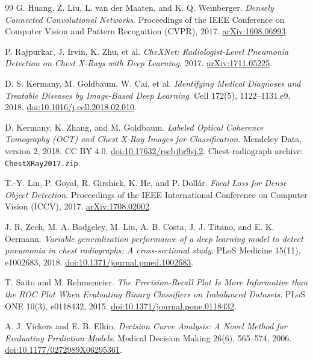 \documentclass[12pt,letterpaper]{article}
\begin{document}
\clearpage
\begin{thebibliography}{99}
G. Huang, Z. Liu, L. van der Maaten, and K. Q. Weinberger.
\textit{Densely Connected Convolutional Networks}.
Proceedings of the IEEE Conference on Computer Vision and Pattern Recognition (CVPR), 2017.
\href{https://arxiv.org/abs/1608.06993}{arXiv:1608.06993}.

P. Rajpurkar, J. Irvin, K. Zhu, et al.
\textit{CheXNet: Radiologist-Level Pneumonia Detection on Chest X-Rays with Deep Learning}.
2017.
\href{https://arxiv.org/abs/1711.05225}{arXiv:1711.05225}.

D. S. Kermany, M. Goldbaum, W. Cai, et al.
\textit{Identifying Medical Diagnoses and Treatable Diseases by Image-Based Deep Learning}.
Cell 172(5), 1122--1131.e9, 2018.
\href{https://doi.org/10.1016/j.cell.2018.02.010}{doi:10.1016/j.cell.2018.02.010}.

D. Kermany, K. Zhang, and M. Goldbaum.
\textit{Labeled Optical Coherence Tomography (OCT) and Chest X-Ray Images for Classification}.
Mendeley Data, version 2, 2018. CC BY 4.0.
\href{https://doi.org/10.17632/rscbjbr9sj.2}{doi:10.17632/rscbjbr9sj.2}.
Chest-radiograph archive: \texttt{ChestXRay2017.zip}.

T.-Y. Lin, P. Goyal, R. Girshick, K. He, and P. Doll\'{a}r.
\textit{Focal Loss for Dense Object Detection}.
Proceedings of the IEEE International Conference on Computer Vision (ICCV), 2017.
\href{https://arxiv.org/abs/1708.02002}{arXiv:1708.02002}.

J. R. Zech, M. A. Badgeley, M. Liu, A. B. Costa, J. J. Titano, and E. K. Oermann.
\textit{Variable generalization performance of a deep learning model to detect pneumonia in chest radiographs: A cross-sectional study}.
PLoS Medicine 15(11), e1002683, 2018.
\href{https://doi.org/10.1371/journal.pmed.1002683}{doi:10.1371/journal.pmed.1002683}.

T. Saito and M. Rehmsmeier.
\textit{The Precision-Recall Plot Is More Informative than the ROC Plot When Evaluating Binary Classifiers on Imbalanced Datasets}.
PLoS ONE 10(3), e0118432, 2015.
\href{https://doi.org/10.1371/journal.pone.0118432}{doi:10.1371/journal.pone.0118432}.

A. J. Vickers and E. B. Elkin.
\textit{Decision Curve Analysis: A Novel Method for Evaluating Prediction Models}.
Medical Decision Making 26(6), 565--574, 2006.
\href{https://doi.org/10.1177/0272989X06295361}{doi:10.1177/0272989X06295361}.


\end{thebibliography}
\end{document}
